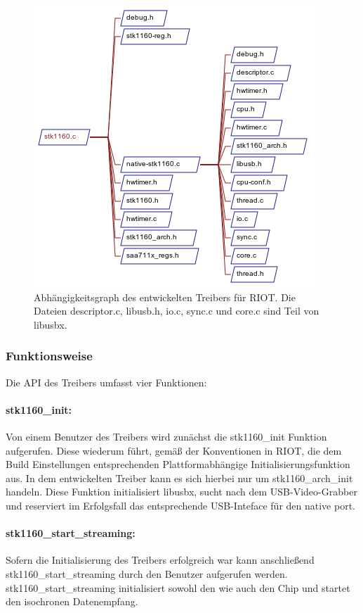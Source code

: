 \begin{figure}[htbp]
 \centering
 \includegraphics{./DependsOnGraph-stk1160-c.png}
 \caption{Abhängigkeitsgraph des entwickelten Treibers für RIOT. Die Dateien descriptor.c, libusb.h, io.c, sync.c und core.c sind Teil von libusbx.}
 \label{fig:dependsgraph}
\end{figure}

\subsubsection{Funktionsweise}
Die API des Treibers umfasst vier Funktionen:

\paragraph{stk1160\_init:}
Von einem Benutzer des Treibers wird zunächst die stk1160\_init Funktion aufgerufen. Diese wiederum führt, gemäß der Konventionen in RIOT, die dem Build Einstellungen entsprechenden Plattformabhängige Initialisierungsfunktion aus. In dem entwickelten Treiber kann es sich hierbei nur um stk1160\_arch\_init handeln.
Diese Funktion initialisiert libusbx, sucht nach dem USB-Video-Grabber und reserviert im Erfolgsfall das entsprechende USB-Inteface für den native port.

\paragraph{stk1160\_start\_streaming:}
Sofern die Initialisierung des Treibers erfolgreich war kann anschließend stk1160\_start\_streaming durch den Benutzer aufgerufen werden. stk1160\_start\_streaming initialisiert sowohl den \stk{} wie auch den \saa{} Chip und startet den isochronen Datenempfang.

